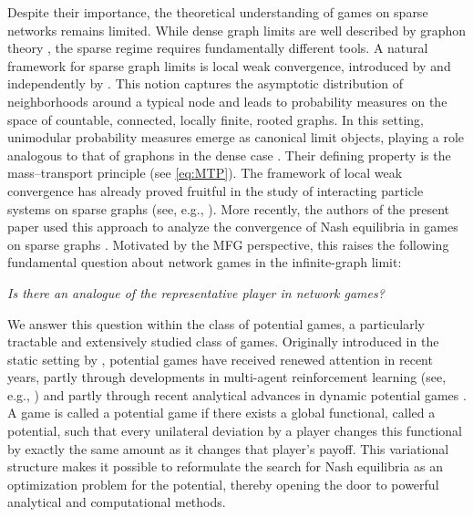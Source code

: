 \documentclass[11pt]{article}
\numberwithin{equation}{section}
\begin{document}
Despite their importance, the theoretical understanding of games on sparse networks remains limited. While dense graph limits are well described by graphon theory \cite{lovasz2012large,lovasz2006limits}, the sparse regime requires fundamentally different tools. A natural framework for sparse graph limits is local weak convergence, introduced by \citet{benjamini2001recurrence} and independently by \citet{aldous2004objective}. This notion captures the asymptotic distribution of neighborhoods around a typical node and leads to probability measures on the space of countable, connected, locally finite, rooted graphs. In this setting, unimodular probability measures emerge as canonical limit objects, playing a role analogous to that of graphons in the dense case \cite{Aldous2007, benjamini2015unimodular}. Their defining property is the mass–transport principle (see \eqref{eq:MTP}). The framework of local weak convergence has already proved fruitful in the study of interacting particle systems on sparse graphs (see, e.g., \citep{ganguly2024hydrodynamic, guo2025particle, LackerRamananWu2021, LackerRamananWu2023b, lacker2023local, lacker2025marginal, oliveira2019interacting, OliveiraReisStolerman2020, ramananICM}). More recently, the authors of the present paper used this approach to analyze the convergence of Nash equilibria in games on sparse graphs \cite{NT26}. Motivated by the MFG perspective, this raises the following fundamental question about network games in the infinite-graph limit:
\begin{center}
\emph{Is there an analogue of the representative player in network games?}
\end{center}

We answer this question within the class of potential games, a particularly tractable and extensively studied class of games. Originally introduced in the static setting by \citet{monderer1996potential}, potential games have received renewed attention in recent years, partly through developments in multi-agent reinforcement learning (see, e.g., \citep{Busoniu2008,DiHuWangZhang2025,Littman1994,Marden2012,PlankZhang2026,ZhangBasar2021}) and partly through recent analytical advances in dynamic potential games \cite{GuoZhang2025,GuoLiZhang2024,GuoLiZhang2025Jumps}. A game is called a potential game if there exists a global functional, called a potential, such that every unilateral deviation by a player changes this functional by exactly the same amount as it changes that player’s payoff. This variational structure makes it possible to reformulate the search for Nash equilibria as an optimization problem for the potential, thereby opening the door to powerful analytical and computational methods.
\end{document}
